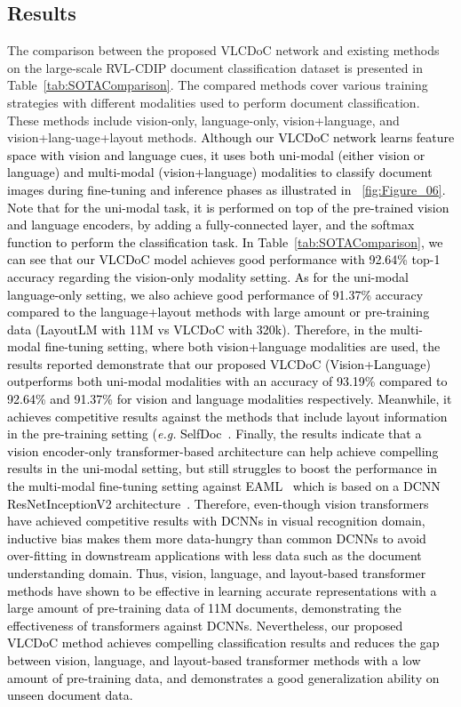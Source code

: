 \documentclass[preprint,review,12pt]{elsarticle}
\newcommand{\eg}{\textit{e.g. }}
\begin{document}
\subsection{Results}
The comparison between the proposed VLCDoC network and existing methods on the large-scale RVL-CDIP document classification dataset is presented in Table~\ref{tab:SOTAComparison}. The compared methods cover various training strategies with different modalities used to perform document classification. These methods include vision-only, language-only, vision+language, and 
vision+lang-uage+layout methods. \textcolor{black}{Although our VLCDoC network learns feature space with vision and language cues, it uses both uni-modal (either vision or language) and multi-modal (vision+language) modalities to classify document images during fine-tuning and inference phases as illustrated in \figurename~\ref{fig:Figure_06}. Note that for the uni-modal task, it is performed on top of the pre-trained vision and language encoders, by adding a fully-connected layer, and the softmax function to perform the classification task. In Table~\ref{tab:SOTAComparison}, we can see that our VLCDoC model achieves good performance with 92.64\% top-1 accuracy regarding the vision-only modality setting. As for the uni-modal language-only setting, we also achieve good performance of 91.37\% accuracy compared to the language+layout methods with large amount or pre-training data (LayoutLM with 11M vs VLCDoC with 320k). Therefore, in the multi-modal fine-tuning setting, where both vision+language modalities are used, the results reported demonstrate that our proposed VLCDoC (Vision+Language) outperforms both uni-modal modalities with an accuracy of 93.19\% compared to 92.64\% and 91.37\% for vision and language modalities respectively. Meanwhile, it achieves competitive results against the methods that include layout information in the pre-training setting (\eg SelfDoc~\cite{li2021selfdoc}. Finally, the results indicate that a vision encoder-only transformer-based architecture can help achieve compelling results in the uni-modal setting, but still struggles to boost the performance in the multi-modal fine-tuning setting against EAML~\cite{bakkali2021eaml} which is based on a DCNN ResNetInceptionV2 architecture~\cite{szegedy2017inception}.} \textcolor{black}{Therefore, even-though vision transformers have achieved competitive results with DCNNs in visual recognition domain, inductive bias makes them more data-hungry than common DCNNs to avoid over-fitting in downstream applications with less data such as the document understanding domain\cite{wu2021cvt}. Thus, vision, language, and layout-based transformer methods have shown to be effective in learning accurate representations with a large amount of pre-training data of 11M documents, demonstrating the effectiveness of transformers against DCNNs. Nevertheless, our proposed VLCDoC method achieves compelling classification results and reduces the gap between vision, language, and layout-based transformer methods with a low amount of pre-training data, and demonstrates a good generalization ability on unseen document data.}
\end{document}
